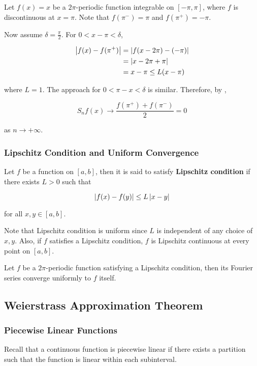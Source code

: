 \documentclass[a4paper,12pt]{article}
\begin{document}
\begin{exm}
  Let $f(x)=x$ be a $2\pi$-periodic function integrable on $[-\pi,\pi]$, where $f$ is discontinuous at $x=\pi$. Note that $f(\pi^{-})=\pi$ and $f(\pi^{+})=-\pi$.\n
  
  Now assume $\delta=\frac{\pi}{2}$. For $0<x-\pi<\delta$,

  $$\begin{aligned}[t]
    \left| f(x)-f(\pi^{+})\right|&=\left| f(x-2\pi)-(-\pi)\right|\\
    &=\left| x-2\pi+\pi\right|\\
    &=x-\pi\leq L(x-\pi)
  \end{aligned}$$\s

  where $L=1$. The approach for $0<\pi-x<\delta$ is similar. Therefore, by \rpst[\sctr{1}],
  
  $$S_{n}f(x)\to\frac{f(\pi^{+})+f(\pi^{-})}{2}=0$$\s

  as $n\to+\infty$.
\end{exm}

\subsubsection{Lipschitz Condition and Uniform Convergence}
\begin{dft}
  Let $f$ be a function on $[a,b]$, then it is said to satisfy \textbf{Lipschitz condition} if there exists $L>0$ such that

  $$\left| f(x)-f(y)\right|\leq L\left| x-y\right|$$\s

  for all $x,y\in[a,b]$.
\end{dft}\n

Note that Lipschitz condition is uniform since $L$ is independent of any choice of $x,y$. Also, if $f$ satisfies a Lipschitz condition, $f$ is Lipschitz continuous at every point on $[a,b]$.\n

\begin{pst}
  Let $f$ be a $2\pi$-periodic function satisfying a Lipschitz condition, then its Fourier series converge uniformly to $f$ itself.
\end{pst}

\subsection{Weierstrass Approximation Theorem}
\subsubsection{Piecewise Linear Functions}
Recall that a continuous function is piecewise linear if there exists a partition such that the function is linear within each subinterval.\n
\end{document}
